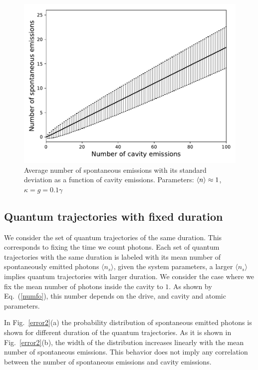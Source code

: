 \documentclass[epj,final]{svjour}
\begin{document}
\begin{figure}[!h]  
\centering
\includegraphics[scale = 0.5]{newsigma1.pdf}
\caption{Average number of spontaneous emissions with its standard
  deviation as a function of cavity emissions. Parameters: $\expval{n} \approx 1$, $\kappa = g = 0.1\gamma$}
\label{graph}
\end{figure} 




\subsection{Quantum trajectories with fixed duration}
We consider the set of quantum trajectories of the same duration. This
corresponds to fixing the time we count photons. Each set of quantum
trajectories with the same duration is labeled with its mean number
of spontaneously emitted photons $\langle n_s\rangle$, given the system
parameters, a larger $\langle n_s\rangle$ implies quantum trajectories
with larger duration. We consider the case where we fix the mean
number of photons inside the cavity to $1$. As shown by
Eq.~(\ref{numfo}), this number depends on the drive, and cavity and
atomic parameters.

In Fig.~\ref{error2}(a) the probability distribution of spontaneous
emitted photons is shown for different duration of the quantum
trajectories. As it is shown in Fig.~\ref{error2}(b), the width of the
distribution increases linearly with the mean number of spontaneous
emissions. This behavior does not imply any correlation between the
number of spontaneous emissions and cavity emissions.
\end{document}
